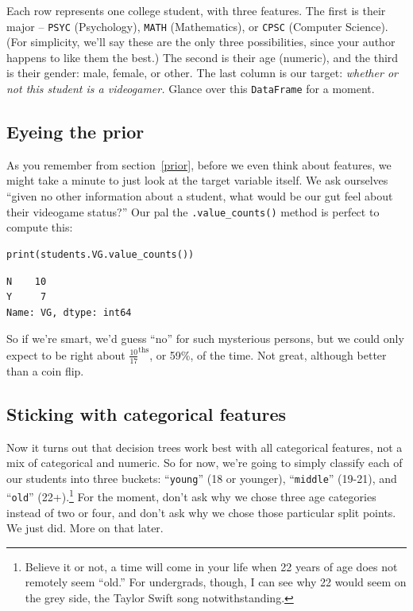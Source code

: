 
Each row represents one college student, with three features. The first is
their major -- \texttt{PSYC} (Psychology), \texttt{MATH} (Mathematics), or
\texttt{CPSC} (Computer Science). (For simplicity, we'll say these are the only
three possibilities, since your author happens to like them the best.) The
second is their age (numeric), and the third is their gender: male, female, or
other. The last column is our target: \textit{whether or not this student is a
videogamer.} Glance over this \texttt{DataFrame} for a moment.

\subsection{Eyeing the prior}


As you remember from section~\ref{prior}, before we even think about features,
we might take a minute to just look at the target variable itself. We ask
ourselves ``given no other information about a student, what would be our gut
feel about their videogame status?'' Our pal the \texttt{.value\_counts()}
method is perfect to compute this:

\begin{Verbatim}[fontsize=\small,samepage=true,frame=single,framesep=3mm]
print(students.VG.value_counts())
\end{Verbatim}
\vspace{-.4in}

\begin{Verbatim}[fontsize=\small,samepage=true,frame=leftline,framesep=5mm,framerule=1mm]
N    10
Y     7
Name: VG, dtype: int64
\end{Verbatim}

So if we're smart, we'd guess ``no'' for such mysterious persons, but we could
only expect to be right about $\frac{10}{17}^\textrm{ths}$, or 59\%, of the
time. Not great, although better than a coin flip.

\smallskip
\subsection{Sticking with categorical features}


Now it turns out that decision trees work best with all categorical features,
not a mix of categorical and numeric. So for now, we're going to simply
classify each of our students into three buckets: ``\texttt{young}'' (18 or
younger), ``\texttt{middle}'' (19-21), and ``\texttt{old}''
(22+).\footnote{ Believe it or not, a time will come in
your life when 22 years of age does not remotely seem ``old.'' For undergrads,
though, I can see why 22 would seem on the grey side, the Taylor Swift song
notwithstanding.} For the moment, don't ask why we chose three age categories
instead of two or four, and don't ask why we chose those particular split
points. We just did. More on that later.

